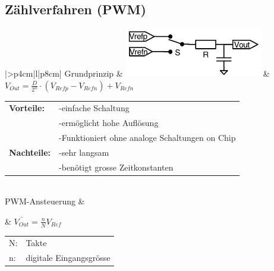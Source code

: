 \subsection{Zählverfahren (PWM)}
\begin{longtable}{|>{\bfseries}p{4cm}|l|p{8cm}|}
	\hline 
	Grundprinzip \hartl{466}
	& \includegraphics[width=6cm, valign=t]{./pictures/pwm_DAC.png}
	& $ V_{Out}=\frac{D}{2^n} \cdot (V_{Refp}-V_{Refn})+V_{Refn} $ \newline
	\begin{tabular}{lp{5cm}}
    \textbf{Vorteile:} 
      &-einfache Schaltung \\
      &-ermöglicht hohe Auflösung \\
      &-Funktioniert ohne analoge Schaltungen on Chip \\
    
    \textbf{Nachteile:}
      &-sehr langsam \\
      &-benötigt grosse Zeitkonstanten 
  \end{tabular}
	\\ \hline
	PWM-Ansteuerung 
	& \parbox[c][2cm]{6cm}{}
	& $\bar{V_{Out}}=\frac{n}{N}V_{Ref}$
	  \begin{tabular}{ll}
		N:&Takte\\
		n:&digitale Eingangsgrösse
	  \end{tabular}
	\\ \hline
\end{longtable}

